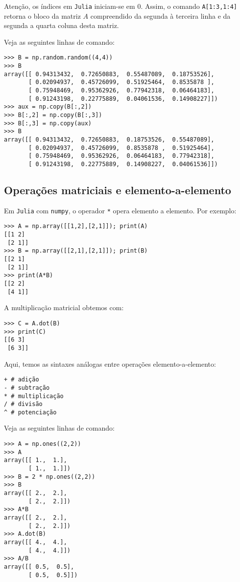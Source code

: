 Atenção, os índices em \verb+Julia+ iniciam-se em $0$. Assim, o comando \verb+A[1:3,1:4]+ retorna o bloco da matriz $A$ compreendido da segunda à terceira linha e da segunda a quarta coluna desta matriz.

\begin{ex}
Veja as seguintes linhas de comando:
\begin{lstlisting}
>>> B = np.random.random((4,4))
>>> B
array([[ 0.94313432,  0.72650883,  0.55487089,  0.18753526],
       [ 0.02094937,  0.45726099,  0.51925464,  0.8535878 ],
       [ 0.75948469,  0.95362926,  0.77942318,  0.06464183],
       [ 0.91243198,  0.22775889,  0.04061536,  0.14908227]])
>>> aux = np.copy(B[:,2])
>>> B[:,2] = np.copy(B[:,3])
>>> B[:,3] = np.copy(aux)
>>> B
array([[ 0.94313432,  0.72650883,  0.18753526,  0.55487089],
       [ 0.02094937,  0.45726099,  0.8535878 ,  0.51925464],
       [ 0.75948469,  0.95362926,  0.06464183,  0.77942318],
       [ 0.91243198,  0.22775889,  0.14908227,  0.04061536]])
\end{lstlisting}
\end{ex}

\subsection{Operações matriciais e elemento-a-elemento}

Em \verb+Julia+ com \verb+numpy+, o operador \verb+*+ opera elemento a elemento. Por exemplo:
\begin{lstlisting}
>>> A = np.array([[1,2],[2,1]]); print(A)
[[1 2]
 [2 1]]
>>> B = np.array([[2,1],[2,1]]); print(B)
[[2 1]
 [2 1]]
>>> print(A*B)
[[2 2]
 [4 1]]
\end{lstlisting}
A multiplicação matricial obtemos com:
\begin{lstlisting}
>>> C = A.dot(B)
>>> print(C)
[[6 3]
 [6 3]]
\end{lstlisting}

Aqui, temos as sintaxes análogas entre operações elemento-a-elemento:
\begin{lstlisting}
+ # adição
- # subtração
* # multiplicação
/ # divisão
^ # potenciação
\end{lstlisting}

\begin{ex}
  Veja as seguintes linhas de comando:
\begin{lstlisting}
>>> A = np.ones((2,2))
>>> A
array([[ 1.,  1.],
       [ 1.,  1.]])
>>> B = 2 * np.ones((2,2))
>>> B
array([[ 2.,  2.],
       [ 2.,  2.]])
>>> A*B
array([[ 2.,  2.],
       [ 2.,  2.]])
>>> A.dot(B)
array([[ 4.,  4.],
       [ 4.,  4.]])
>>> A/B
array([[ 0.5,  0.5],
       [ 0.5,  0.5]])
\end{lstlisting}
\end{ex}

